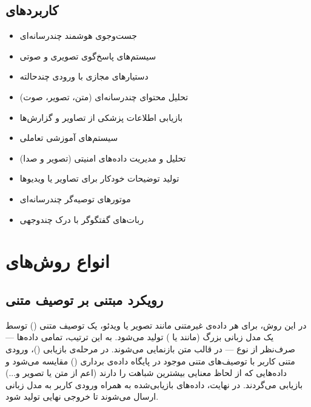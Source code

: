 \documentclass{article}
\begin{document}
\subsection{کاربردهای }
\begin{multicols}{2}
\begin{itemize}
\item جست‌وجوی هوشمند چندرسانه‌ای
\item سیستم‌های پاسخ‌گوی تصویری و صوتی
\item دستیارهای مجازی با ورودی چندحالته
\item تحلیل محتوای چندرسانه‌ای (متن، تصویر، صوت)
\item بازیابی اطلاعات پزشکی از تصاویر و گزارش‌ها
\item سیستم‌های آموزشی تعاملی
\item تحلیل و مدیریت داده‌های امنیتی (تصویر و صدا)
\item تولید توضیحات خودکار برای تصاویر یا ویدیوها
\item موتورهای توصیه‌گر چندرسانه‌ای
\item ربات‌های گفتگوگر با درک چندوجهی
\end{itemize}
\end{multicols}




\section{انواع روش‌های }

\subsection{رویکرد مبتنی بر توصیف متنی }

در این روش، برای هر داده‌ی غیرمتنی مانند تصویر یا ویدئو، یک توصیف متنی () توسط یک مدل زبانی بزرگ (مانند  یا ) تولید می‌شود.
به این ترتیب، تمامی داده‌ها — صرف‌نظر از نوع  — در قالب متن بازنمایی می‌شوند.
در مرحله‌ی بازیابی ()، ورودی متنی کاربر با توصیف‌های متنی موجود در پایگاه داده‌ی برداری () مقایسه می‌شود و داده‌هایی که از لحاظ معنایی بیشترین شباهت را دارند
(اعم از متن یا تصویر و...) بازیابی می‌گردند.
در نهایت، داده‌های بازیابی‌شده به همراه ورودی کاربر به مدل زبانی ارسال می‌شوند تا خروجی نهایی تولید شود.
\end{document}
